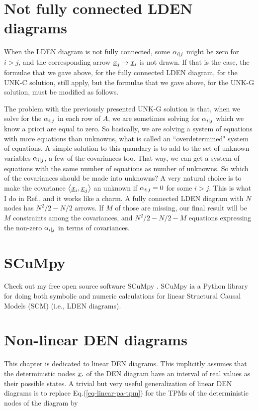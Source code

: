 \section{Not fully connected LDEN diagrams}

When the LDEN diagram is not
fully connected, some $\alpha_{i|j}$
might be zero for $i>j$, and the
corresponding arrow ${\underline{x}}_j\rightarrow{\underline{x}}_i$
is not drawn. If that is the case,
the formulae that we gave above,
for the fully connected LDEN diagram,
for the UNK-C solution, still apply,
but the formulae that we gave above, for the UNK-G solution,
must be modified as follows.

The problem with the previously
presented UNK-G solution is that,
when we solve for the $\alpha_{i|j}$
in each row of $A$,
we are sometimes solving for $\alpha_{i|j}$
which we know a priori are equal to zero.
So basically, we are solving a system of equations with more equations than unknowns,
what is called an ``overdetermined" system
of equations. A simple solution
to this quandary is to add to the set
of unknown variables $\alpha_{i|j}$,
a few of the covariances too.
That way, we can get a system
of equations with the same number of
equations as number of unknowns.
So which of the covariances
should be made into unknowns?
A very natural choice
is to make the covariance $\left\langle{\underline{x}}_i, {\underline{x}}_j\right\rangle$
an unknown if $\alpha_{i|j}=0$
for some $i>j$.
This is what I do in Ref.\cite{scumpy},
and it works like a charm.
A fully connected LDEN diagram with $N$ nodes
has $N^2/2-N/2$ arrows. If $M$ of those are 
missing, our final result 
will be $M$ constraints among the 
covariances, and $N^2/2-N/2 - M$
equations expressing the non-zero $\alpha_{i|j}$
in terms of covariances.


 



\section{SCuMpy}
Check out my free open source
software SCuMpy \cite{scumpy}.
SCuMpy ia a Python library for doing both symbolic and numeric calculations for linear Structural Causal Models (SCM) (i.e., LDEN diagrams).


\section{Non-linear DEN diagrams}
This chapter 
is dedicated to
linear DEN diagrams. This
implicitly
assumes that 
the deterministic
nodes ${\underline{x}}.$
of the 
DEN diagram have
an interval of
real values as their
possible states.
A trivial
but very useful
generalization
of linear DEN diagrams is to
replace Eq.(\ref{eq-linear-pa-tpm})
for the TPMs
of the
deterministic nodes
of the diagram by

